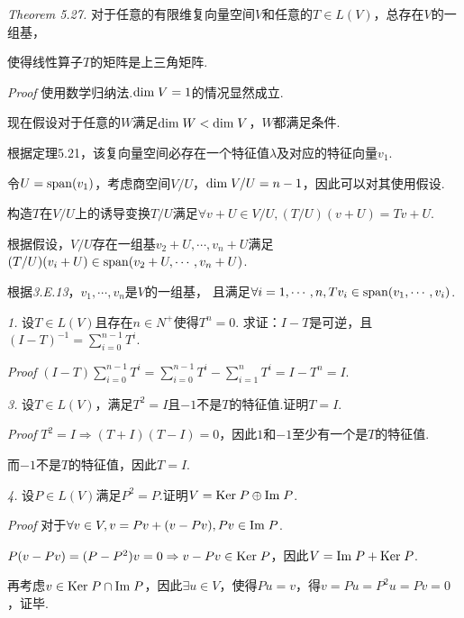 \textit{Theorem 5.27.}
对于任意的有限维复向量空间\(V\)和任意的\(T \in L(V)\)，总存在\(V\)的一组基，

使得线性算子\(T\)的矩阵是上三角矩阵.

\textit{Proof}
使用数学归纳法.\(\mathrm{dim \;} V=1\)的情况显然成立.

现在假设对于任意的\(W\)满足\(\mathrm{dim \;} W<\mathrm{dim \;} V\)，\(W\)都满足条件.

根据定理5.21，该复向量空间必存在一个特征值\(\lambda\)及对应的特征向量\(v_1\).

令\(U=\mathrm{span}(v_1)\)，考虑商空间\(V/U\)，\(\mathrm{dim \;} V/U=n-1\)，因此可以对其使用假设.

构造\(T\)在\(V/U\)上的诱导变换\(T/U\)满足\(\forall v+U \in V/U,(T/U)(v+U)=Tv+U\).

根据假设，\(V/U\)存在一组基\(v_2+U,\cdots,v_n+U\)满足\((T/U)(v_i+U) \in \mathrm{span}(v_2+U,\cdots,v_n+U)\).

根据\textit{3.E.13}，\(v_1,\cdots,v_n\)是\(V\)的一组基，
且满足\(\forall i=1,\cdots,n,Tv_i \in \mathrm{span}(v_1,\cdots,v_i)\).

\hspace*{\fill}

\textit{1.}
设\(T \in L(V)\)且存在\(n \in N^+\)使得\(T^n=0\).
求证：\(I-T\)是可逆，且\((I-T)^{-1}=\sum_{i=0}^{n-1} T^i\).

\textit{Proof}
\((I-T)\sum_{i=0}^{n-1} T^i=\sum_{i=0}^{n-1} T^i-\sum_{i=1}^n T^i=I-T^n=I\).

\hspace*{\fill}

\textit{3.}
设\(T \in L(V)\)，满足\(T^2=I\)且\(-1\)不是\(T\)的特征值.证明\(T=I\).

\textit{Proof}
\(T^2=I \Rightarrow (T+I)(T-I)=0\)，因此\(1\)和\(-1\)至少有一个是\(T\)的特征值.

而\(-1\)不是\(T\)的特征值，因此\(T=I\).

\hspace*{\fill}

\textit{4.}
设\(P \in L(V)\)满足\(P^2=P\).证明\(V=\mathrm{Ker \;} P \oplus \mathrm{Im \;} P\).

\textit{Proof}
对于\(\forall v \in V,v=Pv+(v-Pv),Pv \in \mathrm{Im \;} P\).

\(P(v-Pv)=(P-P^2)v=0 \Rightarrow v-Pv \in \mathrm{Ker \;} P\)，因此\(V=\mathrm{Im \;} P+\mathrm{Ker \;} P\).

再考虑\(v \in \mathrm{Ker \;} P \cap \mathrm{Im \;} P\)，因此\(\exists u \in V\)，使得\(Pu=v\)，得\(v=Pu=P^2u=Pv=0\)，证毕.

\hspace*{\fill}

